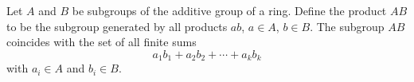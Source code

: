 Let $A$ and $B$ be subgroups of the additive group of a ring. Define the product $AB$ to be the subgroup generated by all products $ab$, $a \in A$, $b \in B$. The subgroup $AB$ coincides with the set of all finite sums
$$a_1 b_1 + a_2 b_2 + \cdots + a_k b_k$$
with $a_i \in A$ and $b_i \in B$.
